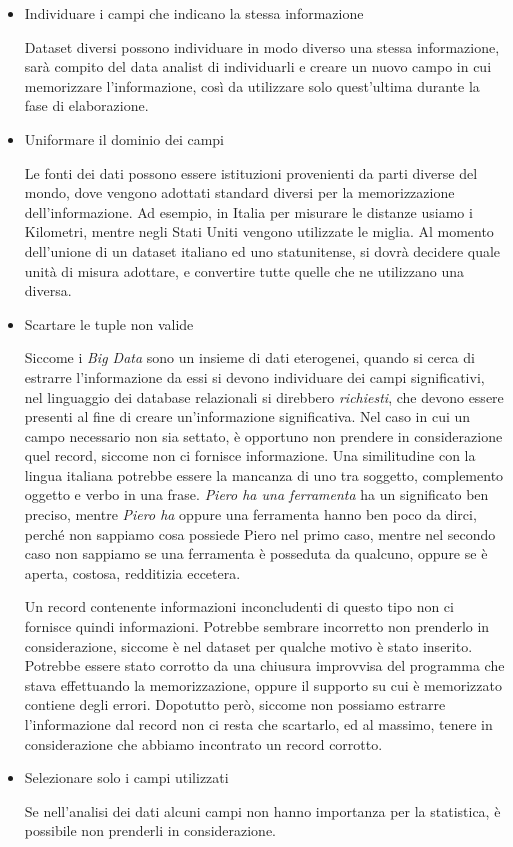 \begin{itemize}
\item Individuare i campi che indicano la stessa informazione

Dataset diversi possono individuare in modo diverso una stessa informazione, sarà compito del data analist di individuarli e creare un nuovo campo in cui memorizzare l'informazione, così da utilizzare solo quest'ultima durante la fase di elaborazione.
\item Uniformare il dominio dei campi

Le fonti dei dati possono essere istituzioni provenienti da parti diverse del mondo, dove vengono adottati standard diversi per la memorizzazione dell'informazione. Ad esempio, in Italia per misurare le distanze usiamo i Kilometri, mentre negli Stati Uniti vengono utilizzate le miglia. Al momento dell'unione di un dataset italiano ed uno statunitense, si dovrà decidere quale unità di misura adottare, e convertire tutte quelle che ne utilizzano una diversa.
\item Scartare le tuple non valide

Siccome i \emph{Big Data} sono un insieme di dati eterogenei, quando si cerca di estrarre l'informazione da essi si devono individuare dei campi significativi, nel linguaggio dei database relazionali si direbbero \emph{richiesti}, che devono essere presenti al fine di creare un'informazione significativa. Nel caso in cui un campo necessario non sia settato, è opportuno non prendere in considerazione quel record, siccome non ci fornisce informazione. Una similitudine con la lingua italiana potrebbe essere la mancanza di uno tra soggetto, complemento oggetto e verbo in una frase. \emph{Piero ha una ferramenta} ha un significato ben preciso, mentre \emph{Piero ha} oppure {una ferramenta} hanno ben poco da dirci, perché non sappiamo cosa possiede Piero nel primo caso, mentre nel secondo caso non sappiamo se una ferramenta è posseduta da qualcuno, oppure se è aperta, costosa, redditizia eccetera. 

Un record contenente informazioni inconcludenti di questo tipo non ci fornisce quindi informazioni. Potrebbe sembrare incorretto non prenderlo in considerazione, siccome è nel dataset per qualche motivo è stato inserito. Potrebbe essere stato corrotto da una chiusura improvvisa del programma che stava effettuando la memorizzazione, oppure il supporto su cui è memorizzato contiene degli errori. Dopotutto però, siccome non possiamo estrarre l'informazione dal record non ci resta che scartarlo, ed al massimo, tenere in considerazione che abbiamo incontrato un record corrotto.
\item Selezionare solo i campi utilizzati

Se nell'analisi dei dati alcuni campi non hanno importanza per la statistica, è possibile non prenderli in considerazione.
\end{itemize}

